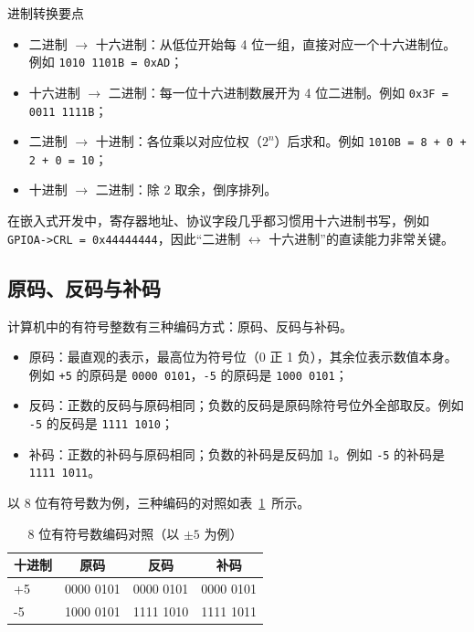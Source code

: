 \begin{anybox}{进制转换要点}

\begin{itemize}
\item 二进制 $\rightarrow$ 十六进制：从低位开始每 4 位一组，直接对应一个十六进制位。例如 \texttt{1010 1101B = 0xAD}；
\item 十六进制 $\rightarrow$ 二进制：每一位十六进制数展开为 4 位二进制。例如 \texttt{0x3F = 0011 1111B}；
\item 二进制 $\rightarrow$ 十进制：各位乘以对应位权（$2^n$）后求和。例如 \texttt{1010B = 8 + 0 + 2 + 0 = 10}；
\item 十进制 $\rightarrow$ 二进制：除 2 取余，倒序排列。
\end{itemize}

在嵌入式开发中，寄存器地址、协议字段几乎都习惯用十六进制书写，例如 \texttt{GPIOA->CRL = 0x44444444}，因此“二进制 $\leftrightarrow$ 十六进制”的直读能力非常关键。

\end{anybox}
\subsection{原码、反码与补码}

计算机中的有符号整数有三种编码方式：原码、反码与补码。

\begin{itemize}
\item 原码：最直观的表示，最高位为符号位（0 正 1 负），其余位表示数值本身。例如 \texttt{+5} 的原码是 \texttt{0000 0101}，\texttt{-5} 的原码是 \texttt{1000 0101}；
\item 反码：正数的反码与原码相同；负数的反码是原码除符号位外全部取反。例如 \texttt{-5} 的反码是 \texttt{1111 1010}；
\item 补码：正数的补码与原码相同；负数的补码是反码加 1。例如 \texttt{-5} 的补码是 \texttt{1111 1011}。
\end{itemize}

以 8 位有符号数为例，三种编码的对照如表~\ref{tab:code}~所示。

\begin{table}[htbp]
\centering \caption{8 位有符号数编码对照（以 $\pm 5$ 为例）} \label{tab:code}
    \begin{tabular}{lccc}
        \toprule
        十进制 & 原码 & 反码 & 补码 \\
        \midrule
        +5 & 0000 0101 & 0000 0101 & 0000 0101 \\
        -5 & 1000 0101 & 1111 1010 & 1111 1011 \\
        \bottomrule
    \end{tabular}
\end{table}

